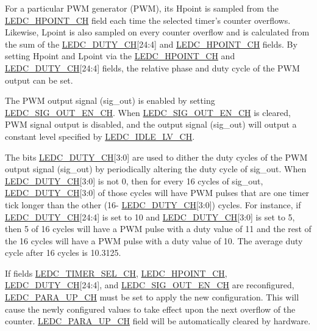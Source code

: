 \documentclass[main\_\_EN.tex]{subfiles}
\begin{document}
For a particular PWM generator (PWM), its Hpoint is sampled from the \hyperref[fielddesc:LEDCHPOINTCHN]{LEDC\_HPOINT\_CH} field each time the selected timer’s counter overflows. Likewise, Lpoint is also sampled on every counter overflow and is calculated from the sum of the \hyperref[fielddesc:LEDCDUTYCHN]{LEDC\_DUTY\_CH}[24:4] and \hyperref[fielddesc:LEDCHPOINTCHN]{LEDC\_HPOINT\_CH} fields. By setting Hpoint and Lpoint via the \hyperref[fielddesc:LEDCHPOINTCHN]{LEDC\_HPOINT\_CH} and \hyperref[fielddesc:LEDCDUTYCHN]{LEDC\_DUTY\_CH}[24:4] fields, the relative phase and duty cycle of the PWM output can be set.

The PWM output signal (sig\_out) is enabled by setting \hyperref[fielddesc:LEDCSIGOUTENCHN]{LEDC\_SIG\_OUT\_EN\_CH}. When \hyperref[fielddesc:LEDCSIGOUTENCHN]{LEDC\_SIG\_OUT\_EN\_CH} is cleared, PWM signal output is disabled, and the output signal (sig\_out) will output a constant level specified by \hyperref[fielddesc:LEDCIDLELVCHN]{LEDC\_IDLE\_LV\_CH}.

The bits \hyperref[fielddesc:LEDCDUTYCHN]{LEDC\_DUTY\_CH}[3:0] are used to dither the duty cycles of the PWM output signal (sig\_out) by periodically altering the duty cycle of sig\_out. When \hyperref[fielddesc:LEDCDUTYCHN]{LEDC\_DUTY\_CH}[3:0] is not 0, then for every 16 cycles of sig\_out, \hyperref[fielddesc:LEDCDUTYCHN]{LEDC\_DUTY\_CH}[3:0] of those cycles will have PWM pulses that are one timer tick longer than the other (16- \hyperref[fielddesc:LEDCDUTYCHN]{LEDC\_DUTY\_CH}[3:0]) cycles. For instance, if \hyperref[fielddesc:LEDCDUTYCHN]{LEDC\_DUTY\_CH}[24:4] is set to 10 and \hyperref[fielddesc:LEDCDUTYCHN]{LEDC\_DUTY\_CH}[3:0] is set to 5, then 5 of 16 cycles will have a PWM pulse with a duty value of 11 and the rest of the 16 cycles will have a PWM pulse with a duty value of 10. The average duty cycle after 16 cycles is 10.3125.

If fields \hyperref[fielddesc:LEDCTIMERSELCHN]{LEDC\_TIMER\_SEL\_CH},
\hyperref[fielddesc:LEDCHPOINTCHN]{LEDC\_HPOINT\_CH}, \hyperref[fielddesc:LEDCDUTYCHN]{LEDC\_DUTY\_CH}[24:4], and  \hyperref[fielddesc:LEDCSIGOUTENCHN]{LEDC\_SIG\_OUT\_EN\_CH} are reconfigured, \hyperref[fielddesc:LEDCPARAUPCHN]{LEDC\_PARA\_UP\_CH} must be set to apply the new configuration. This will cause the newly configured values to take effect upon the next overflow of the counter. \hyperref[fielddesc:LEDCPARAUPCHN]{LEDC\_PARA\_UP\_CH} field will be automatically cleared by hardware.
\end{document}
